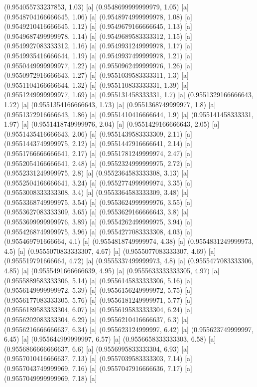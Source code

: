 {{{(0.954055733237853, 1.03) [a] 
(0.9548699999999979, 1.05) [a] 
(0.9548704166666645, 1.06) [a] 
(0.9548974999999978, 1.08) [a] 
(0.9549210416666645, 1.12) [a] 
(0.9549679166666645, 1.13) [a] 
(0.9549687499999978, 1.14) [a] 
(0.9549689583333312, 1.15) [a] 
(0.9549927083333312, 1.16) [a] 
(0.9549931249999978, 1.17) [a] 
(0.9549935416666644, 1.19) [a] 
(0.9549937499999978, 1.21) [a] 
(0.9550449999999977, 1.22) [a] 
(0.9550962499999976, 1.26) [a] 
(0.9550972916666643, 1.27) [a] 
(0.9551039583333311, 1.3) [a] 
(0.9551104166666644, 1.32) [a] 
(0.955110833333331, 1.39) [a] 
(0.9551249999999977, 1.69) [a] 
(0.955131458333331, 1.7) [a] 
(0.9551329166666643, 1.72) [a] 
(0.9551354166666643, 1.73) [a] 
(0.9551368749999977, 1.8) [a] 
(0.9551372916666643, 1.86) [a] 
(0.9551410416666644, 1.9) [a] 
(0.955141458333331, 1.97) [a] 
(0.9551418749999976, 2.04) [a] 
(0.9551429166666643, 2.05) [a] 
(0.9551435416666643, 2.06) [a] 
(0.9551439583333309, 2.11) [a] 
(0.9551443749999975, 2.12) [a] 
(0.9551447916666641, 2.14) [a] 
(0.9551766666666641, 2.17) [a] 
(0.9551781249999974, 2.47) [a] 
(0.9552054166666641, 2.48) [a] 
(0.9552324999999975, 2.72) [a] 
(0.9552331249999975, 2.8) [a] 
(0.9552364583333308, 3.13) [a] 
(0.9552504166666641, 3.24) [a] 
(0.9552774999999974, 3.35) [a] 
(0.9553008333333308, 3.4) [a] 
(0.9553364583333309, 3.48) [a] 
(0.9553368749999975, 3.54) [a] 
(0.9553624999999976, 3.55) [a] 
(0.9553627083333309, 3.65) [a] 
(0.9553629166666643, 3.8) [a] 
(0.9553699999999976, 3.89) [a] 
(0.9554262499999975, 3.94) [a] 
(0.9554268749999975, 3.96) [a] 
(0.9554277083333308, 4.03) [a] 
(0.955469791666664, 4.1) [a] 
(0.9554818749999974, 4.38) [a] 
(0.9554831249999973, 4.5) [a] 
(0.9555070833333307, 4.67) [a] 
(0.9555077083333307, 4.69) [a] 
(0.955519791666664, 4.72) [a] 
(0.9555337499999973, 4.8) [a] 
(0.9555477083333306, 4.85) [a] 
(0.9555491666666639, 4.95) [a] 
(0.9555633333333305, 4.97) [a] 
(0.9555889583333306, 5.14) [a] 
(0.9556145833333306, 5.16) [a] 
(0.9556149999999972, 5.39) [a] 
(0.9556156249999972, 5.75) [a] 
(0.9556177083333305, 5.76) [a] 
(0.9556181249999971, 5.77) [a] 
(0.9556189583333304, 6.07) [a] 
(0.9556195833333304, 6.24) [a] 
(0.9556202083333304, 6.29) [a] 
(0.9556210416666637, 6.3) [a] 
(0.9556216666666637, 6.34) [a] 
(0.955623124999997, 6.42) [a] 
(0.955623749999997, 6.45) [a] 
(0.955644999999997, 6.57) [a] 
(0.9556658333333303, 6.58) [a] 
(0.9556866666666637, 6.6) [a] 
(0.9556995833333304, 6.93) [a] 
(0.9557010416666637, 7.13) [a] 
(0.9557039583333303, 7.14) [a] 
(0.9557043749999969, 7.16) [a] 
(0.9557047916666636, 7.17) [a] 
(0.9557049999999969, 7.18) [a] 
}}}
